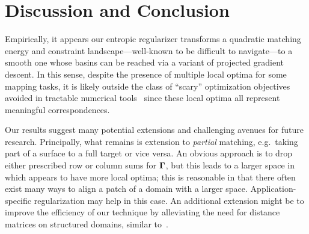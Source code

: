 
\section{Discussion and Conclusion}



Empirically, it appears our entropic regularizer transforms a quadratic matching energy and constraint landscape---well-known to be difficult to navigate---to a smooth one whose basins can be reached via a variant of projected gradient descent.   In this sense, despite the presence of multiple local optima for some mapping tasks, it is likely outside the class of ``scary'' optimization objectives avoided in tractable numerical tools~\cite{sun-2015} since these local optima all represent meaningful correspondences.

Our results suggest many potential extensions and challenging avenues for future research.  Principally, what remains is extension to \emph{partial} matching, e.g.\ taking part of a surface to a full target or vice versa.  An obvious approach is to drop either prescribed row or column sums for $\mathbf \Gamma$, but this leads to a larger space in which \GWa appears to have more local optima; this is reasonable in that there often exist many ways to align a patch of a domain with a larger space.  Application-specific regularization may help in this case.  An additional extension might be to improve the efficiency of our technique by alleviating the need for distance matrices on structured domains, similar to~\cite{solomon-2015}.


